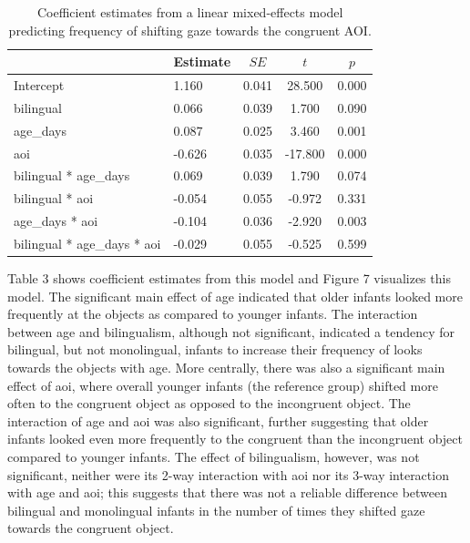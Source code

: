 \documentclass[,man,floatsintext]{apa6}
\begin{document}
\begin{table}[tbp]
\begin{center}
\begin{threeparttable}
\caption{\label{tab:coef_table_frequency}Coefficient estimates from a linear mixed-effects model predicting frequency of shifting gaze towards the congruent AOI.}
\begin{tabular}{llccc}
\toprule
 & Estimate & $SE$ & $t$ & $p$\\
\midrule
Intercept & 1.160 & 0.041 & 28.500 & 0.000\\
bilingual & 0.066 & 0.039 & 1.700 & 0.090\\
age\_days & 0.087 & 0.025 & 3.460 & 0.001\\
aoi & -0.626 & 0.035 & -17.800 & 0.000\\
bilingual * age\_days & 0.069 & 0.039 & 1.790 & 0.074\\
bilingual * aoi & -0.054 & 0.055 & -0.972 & 0.331\\
age\_days * aoi & -0.104 & 0.036 & -2.920 & 0.003\\
bilingual * age\_days * aoi & -0.029 & 0.055 & -0.525 & 0.599\\
\bottomrule
\end{tabular}
\end{threeparttable}
\end{center}
\end{table}

\noindent Table 3 shows coefficient estimates from this model and Figure 7 visualizes this model. The significant main effect of age indicated that older infants looked more frequently at the objects as compared to younger infants. The interaction between age and bilingualism, although not significant, indicated a tendency for bilingual, but not monolingual, infants to increase their frequency of looks towards the objects with age. More centrally, there was also a significant main effect of aoi, where overall younger infants (the reference group) shifted more often to the congruent object as opposed to the incongruent object. The interaction of age and aoi was also significant, further suggesting that older infants looked even more frequently to the congruent than the incongruent object compared to younger infants. The effect of bilingualism, however, was not significant, neither were its 2-way interaction with aoi nor its 3-way interaction with age and aoi; this suggests that there was not a reliable difference between bilingual and monolingual infants in the number of times they shifted gaze towards the congruent object.
\end{document}
